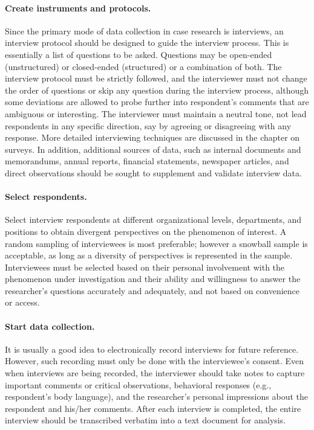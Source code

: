 \paragraph{Create instruments and protocols.} Since the primary mode of data collection in case research is interviews, an interview protocol should be designed to guide the interview process. This is essentially a list of questions to be asked. Questions may be open-ended (unstructured) or closed-ended (structured) or a combination of both. The interview protocol must be strictly followed, and the interviewer must not change the order of questions or skip any question during the interview process, although some deviations are allowed to probe further into respondent's comments that are ambiguous or interesting. The interviewer must maintain a neutral tone, not lead respondents in any specific direction, say by agreeing or disagreeing with any response. More detailed interviewing techniques are discussed in the chapter on surveys. In addition, additional sources of data, such as internal documents and memorandums, annual reports, financial statements, newspaper articles, and direct observations should be sought to supplement and validate interview data.

\paragraph{Select respondents.} Select interview respondents at different organizational levels, departments, and positions to obtain divergent perspectives on the phenomenon of interest. A random sampling of interviewees is most preferable; however a snowball sample is acceptable, as long as a diversity of perspectives is represented in the sample. Interviewees must be selected based on their personal involvement with the phenomenon under investigation and their ability and willingness to answer the researcher's questions accurately and adequately, and not based on convenience or access.

\paragraph{Start data collection.} It is usually a good idea to electronically record interviews for future reference. However, such recording must only be done with the interviewee's consent. Even when interviews are being recorded, the interviewer should take notes to capture important comments or critical observations, behavioral responses (e.g., respondent's body language), and the researcher's personal impressions about the respondent and his/her comments. After each interview is completed, the entire interview should be transcribed verbatim into a text document for analysis.

